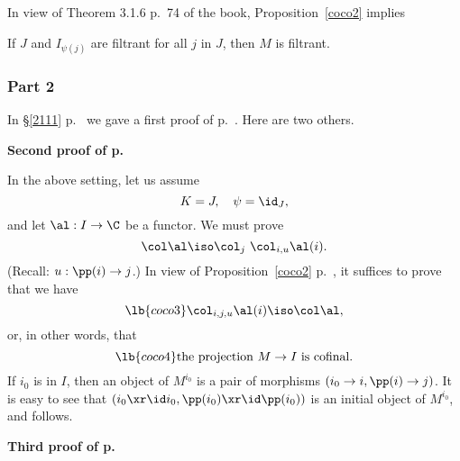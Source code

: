 \documentclass[12pt]{article}
\theoremstyle{remark}
\theoremstyle{definition}
\begin{document}
In view of Theorem 3.1.6 p.~74 of the book, Proposition~\ref{coco2} implies 
%
\begin{prop} 
If $J$ and $I_{\psi(j)}$ are filtrant for all $j$ in $J$, then $M$ is filtrant.
\end{prop}

%

\subsubsection{Part 2}

In \S\ref{2111} p.~ we gave a first proof of  p.~. Here are two others.

\nn\textbf{Second proof of  p.~}

\nn In the above setting, let us assume 
$$
K=J,\quad\psi=\id_J,
$$ 
and let $\al:I\to\C$ be a functor. We must prove 
$$
\col\al\iso\col_j\ \col_{i,u}\al(i). 
$$ 
(Recall: $u:\pp(i)\to j$.) In view of Proposition~\ref{coco2} p.~, it suffices to prove that we have 
\begin{equation}\lb{coco3} 
\col_{i,j,u}\al(i)\iso\col\al,
\end{equation} 
or, in other words, that 
\begin{equation}\lb{coco4} 
\text{the projection $M\to I$ is cofinal.} 
\end{equation} 
If $i_0$ is in $I$, then an object of $M^{i_0}$ is a pair of morphisms $(i_0\to i,\pp(i)\to j)$. It is easy to see that $(i_0\xr\id i_0,\pp(i_0)\xr\id\pp(i_0))$ is an initial object of $M^{i_0}$, and  follows.%

\nn\textbf{Third proof of  p.~}
\end{document}
